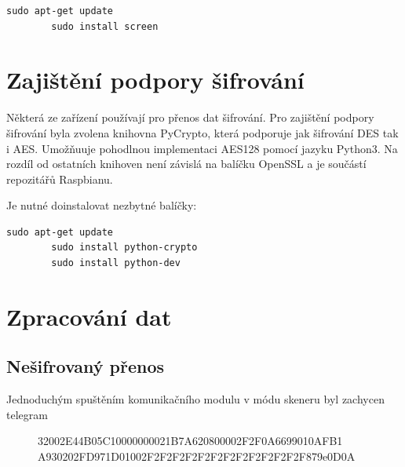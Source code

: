 \begin{lstlisting}[style=MyCodeBash]
		sudo apt-get update
		sudo install screen		
	\end{lstlisting}



\section{Zajištění podpory šifrování}
Některá ze zařízení používají pro přenos dat šifrování. Pro zajištění podpory šifrování byla zvolena knihovna PyCrypto, která podporuje jak šifrování DES tak i AES. 
Umožňuuje pohodlnou implementaci AES128 pomocí jazyku Python3. Na rozdíl od ostatních knihoven není závislá na balíčku OpenSSL a je součástí repozitářů Raspbianu. 

Je nutné doinstalovat nezbytné balíčky:	
 
\begin{lstlisting}[style=MyCodeBash]
		sudo apt-get update
		sudo install python-crypto
		sudo install python-dev
	\end{lstlisting}
	\vspace{-20pt}


\section{Zpracování dat}

\subsection{Nešifrovaný přenos}

Jednoduchým spuštěním komunikačního modulu v módu skeneru byl zachycen telegram

\vspace{-10pt}
\begin{figure}[!ht]
\begin{centerverbatim}
	32002E44B05C10000000021B7A620800002F2F0A6699010AFB1
	A930202FD971D01002F2F2F2F2F2F2F2F2F2F2F2F2F879e0D0A
\end{centerverbatim}
\end{figure}
\vspace{-5pt}


